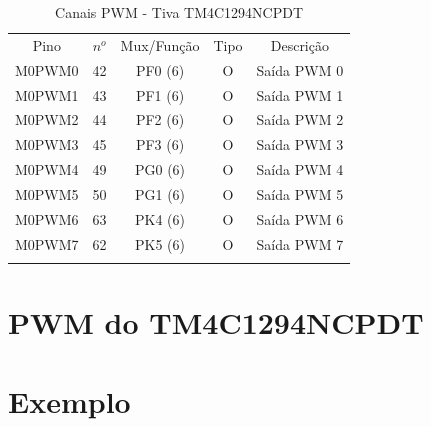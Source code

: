 \begin{center}
	\begin{longtable}{|c|c|c|c|c|}
		\rowcolor[HTML]{000000}
		{\color[HTML]{FFFFFF} Pino} & {\color[HTML]{FFFFFF} $n^{o}$} & {\color[HTML]{FFFFFF} Mux/Função} & {\color[HTML]{FFFFFF} Tipo} & {\color[HTML]{FFFFFF} Descrição}            \\
		M0PWM0    & 42  & PF0 (6) & O & Saída PWM 0\\
		M0PWM1    & 43  & PF1 (6) & O & Saída PWM 1\\
		M0PWM2    & 44  & PF2 (6) & O & Saída PWM 2\\
		M0PWM3    & 45  & PF3 (6) & O & Saída PWM 3\\
		M0PWM4    & 49  & PG0 (6) & O & Saída PWM 4\\
		M0PWM5    & 50  & PG1 (6) & O & Saída PWM 5\\
		M0PWM6    & 63  & PK4 (6) & O & Saída PWM 6\\
		M0PWM7    & 62  & PK5 (6) & O & Saída PWM 7\\
		\hline
		\caption{Canais PWM - Tiva TM4C1294NCPDT \cite{DATASHEET_TIVA} }
		\label{tab:CanaisPWM}
	\end{longtable}
\end{center}

\section{PWM do TM4C1294NCPDT}

\section{Exemplo}
